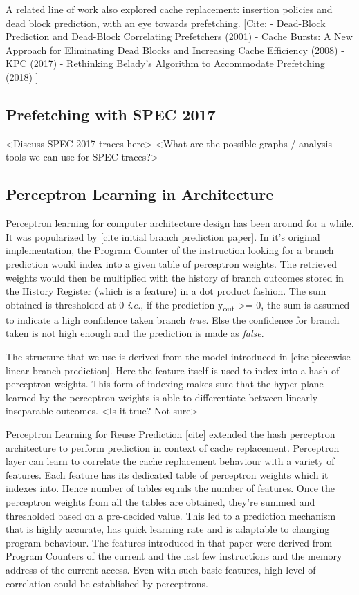 \documentclass{sig-alternate}
\begin{document}
A related line of work also explored cache replacement: insertion policies and dead block prediction, with an eye towards prefetching. [Cite:\newline
- Dead-Block Prediction and Dead-Block Correlating Prefetchers (2001)\newline
- Cache Bursts: A New Approach for Eliminating Dead Blocks and Increasing Cache Efficiency (2008)\newline
- KPC (2017)\newline
- Rethinking Belady's Algorithm to Accommodate Prefetching (2018)\newline
]

\subsection{Prefetching with SPEC 2017}
<Discuss SPEC 2017 traces here>
<What are the possible graphs / analysis tools we can use for SPEC traces?>

\subsection{Perceptron Learning in Architecture}

Perceptron learning for computer architecture design has been around for a while. It was popularized by [cite initial branch prediction paper]. In it's original implementation, the Program Counter of the instruction looking for a branch prediction would index into a given table of perceptron weights. The retrieved weights would then be multiplied with the history of branch outcomes stored in the History Register (which is a feature) in a dot product fashion. The sum obtained is thresholded at 0 \textit{i.e.}, if the prediction y\textsubscript{out} >= 0, the sum is assumed to indicate a  high confidence taken branch \textit{true}. Else the confidence for branch taken is not high enough and the prediction is made as \textit{false}.

The structure that we use is derived from the model introduced in [cite piecewise linear branch prediction]. Here the feature itself is used to index into a hash of perceptron weights. This form of indexing makes sure that the hyper-plane learned by the perceptron weights is able to differentiate between linearly inseparable outcomes. <Is it true? Not sure>

Perceptron Learning for Reuse Prediction [cite] extended the hash perceptron architecture to perform prediction in context of cache replacement. Perceptron layer can learn to correlate the cache replacement behaviour with a variety of features. Each feature has its dedicated table of perceptron weights which it indexes into. Hence number of tables equals the number of features. Once the perceptron weights from all the tables are obtained, they're summed and thresholded based on a pre-decided value. This led to a prediction mechanism that is highly accurate, has quick learning rate and is adaptable to changing program behaviour. The features introduced in that paper were derived from Program Counters of the current and the last few instructions and the memory address of the current access. Even with such basic features, high level of correlation could be established by perceptrons. 
\end{document}
